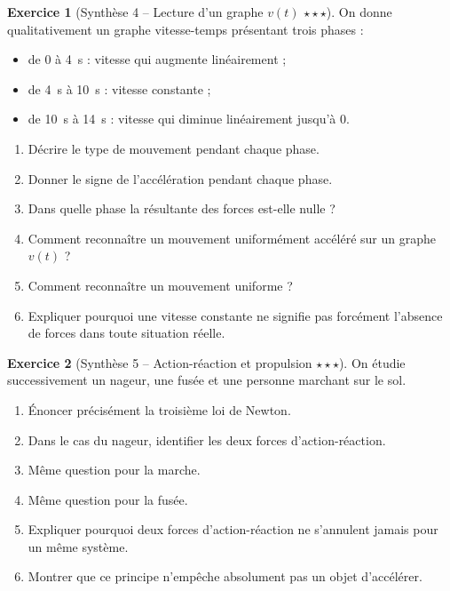 \documentclass[11pt,a4paper]{article}
\theoremstyle{definition}
\newtheorem{exercice}{Exercice}[section]
\newcommand{\etoiles}[1]{\hfill{\small\textbf{#1}}}
\begin{document}
\begin{exercice}[Synthèse 4 -- Lecture d’un graphe $v(t)$ \etoiles{$\star\star\star$}]
On donne qualitativement un graphe vitesse-temps présentant trois phases :
\begin{itemize}
    \item de 0 à \SI{4}{s} : vitesse qui augmente linéairement ;
    \item de \SI{4}{s} à \SI{10}{s} : vitesse constante ;
    \item de \SI{10}{s} à \SI{14}{s} : vitesse qui diminue linéairement jusqu’à 0.
\end{itemize}

\begin{enumerate}[label=\arabic*.]
    \item Décrire le type de mouvement pendant chaque phase.
    \item Donner le signe de l’accélération pendant chaque phase.
    \item Dans quelle phase la résultante des forces est-elle nulle ?
    \item Comment reconnaître un mouvement uniformément accéléré sur un graphe $v(t)$ ?
    \item Comment reconnaître un mouvement uniforme ?
    \item Expliquer pourquoi une vitesse constante ne signifie pas forcément l’absence de forces dans toute situation réelle.
\end{enumerate}
\end{exercice}

\begin{exercice}[Synthèse 5 -- Action-réaction et propulsion \etoiles{$\star\star\star$}]
On étudie successivement un nageur, une fusée et une personne marchant sur le sol.

\begin{enumerate}[label=\arabic*.]
    \item Énoncer précisément la troisième loi de Newton.
    \item Dans le cas du nageur, identifier les deux forces d’action-réaction.
    \item Même question pour la marche.
    \item Même question pour la fusée.
    \item Expliquer pourquoi deux forces d’action-réaction ne s’annulent jamais pour un même système.
    \item Montrer que ce principe n’empêche absolument pas un objet d’accélérer.
\end{enumerate}
\end{exercice}
\end{document}

